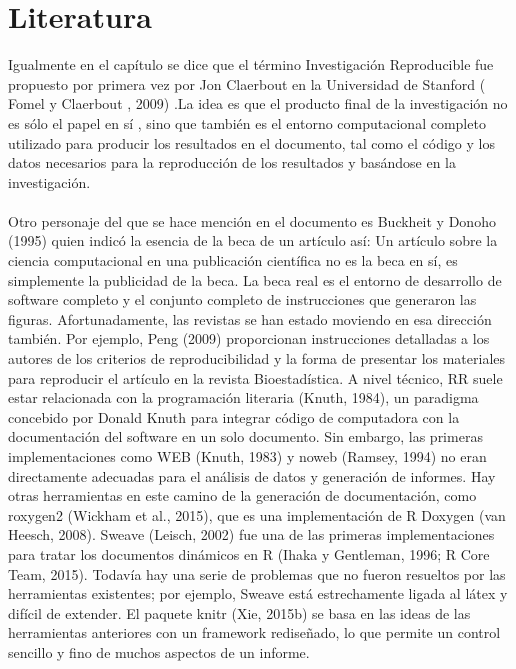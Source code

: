 \documentclass[conference]{IEEEtran}
\begin{document}
\section{Literatura}
	Igualmente en el capítulo se dice que el término Investigación Reproducible fue propuesto por primera vez por Jon Claerbout en la Universidad de Stanford ( Fomel y Claerbout , 2009) .La idea es que el producto final de la investigación no es sólo el papel en sí , sino que también es el entorno computacional completo utilizado para producir los resultados en el documento, tal como el código y los datos necesarios para la reproducción de los resultados y basándose en la investigación.\\\\
Otro personaje del que se hace mención en el documento es Buckheit y Donoho (1995) quien indicó la esencia de la beca de un artículo así: Un artículo sobre la ciencia computacional en una publicación científica no es la beca en sí, es simplemente la publicidad de la beca. La beca real es el entorno de desarrollo de software completo y el conjunto completo de instrucciones que generaron las figuras. Afortunadamente, las revistas se han estado moviendo en esa dirección también. Por ejemplo, Peng (2009) proporcionan instrucciones detalladas a los autores de los criterios de reproducibilidad y la forma de presentar los materiales para reproducir el artículo en la revista Bioestadística.
A nivel técnico, RR suele estar relacionada con la programación literaria (Knuth, 1984), un paradigma concebido por Donald Knuth para integrar código de computadora con la documentación del software en un solo documento. Sin embargo, las primeras implementaciones como WEB (Knuth, 1983) y noweb (Ramsey, 1994) no eran directamente adecuadas para el análisis de datos y generación de informes. Hay otras herramientas en este camino de la generación de documentación, como roxygen2 (Wickham et al., 2015), que es una implementación de R Doxygen (van Heesch, 2008). Sweave (Leisch, 2002) fue una de las primeras implementaciones para tratar los documentos dinámicos en R (Ihaka y Gentleman, 1996; R Core Team, 2015). Todavía hay una serie de problemas que no fueron resueltos por las herramientas existentes; por ejemplo, Sweave está estrechamente ligada al látex y difícil de extender. El paquete knitr (Xie, 2015b) se basa en las ideas de las herramientas anteriores con un framework rediseñado, lo que permite un control sencillo y fino de muchos aspectos de un informe. \\\\
\end{document}
